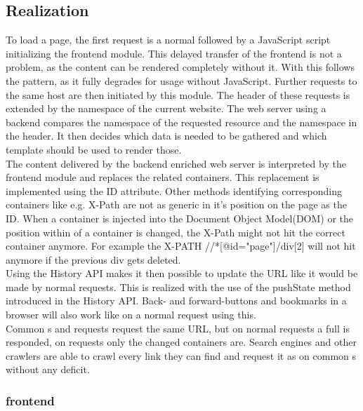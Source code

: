 \subsection{Realization\label{sec:lare_realization}}
To load a page, the first request is a normal \httpRequest{} followed by a JavaScript script initializing the \lare{} frontend module.
This delayed transfer of the frontend is not a problem, as the content can be rendered completely without it.
With this \lare{} follows the \hijax{} pattern, as it fully degrades for usage without JavaScript.
Further requests to the same host are then initiated by this module.
The \http{} header of these requests is extended by the namespace of the current website.
The web server using a \lare{} backend compares the namespace of the requested resource and the namespace in the \http{} header.
It then decides which data is needed to be gathered and which template should be used to render those.
\\
The content delivered by the \lare{} backend enriched web server is interpreted by the frontend module and replaces the related containers.
This replacement is implemented using the ID attribute.
Other methods identifying corresponding containers like e.g. X-Path are not as generic in it's position on the page as the ID.
When a container is injected into the Document Object Model(DOM) or the position within of a container is changed, the X-Path might not hit the correct container anymore.
For example the X-PATH //*[@id="page"]/div[2] will not hit anymore if the previous div gets deleted.
\\
Using the History API makes it then possible to update the URL like it would be made by normal requests.
This is realized with the use of the pushState method introduced in the History API.
Back- and forward-buttons and bookmarks in a browser will also work like on a normal request using this.
\\
Common \httpRequest{}s and \lare{} requests request the same URL, but on normal requests a full \webPage{} is responded, on \lare{} requests only the changed containers are.
Search engines and other crawlers are able to crawl every link they can find and request it as on common \webPage{}s without any deficit.

\subsubsection{\lare{} frontend\label{sec:lare_frontend}}

